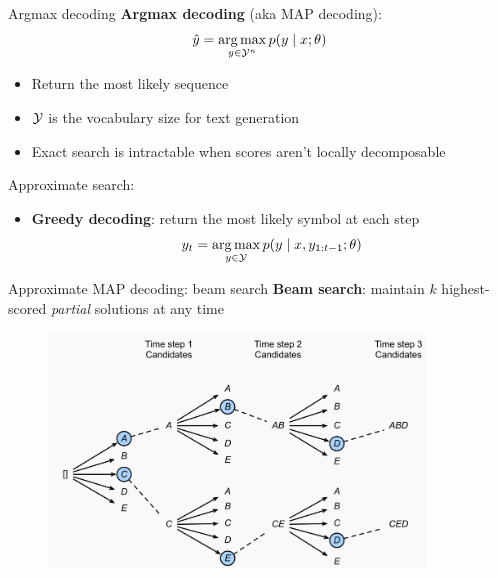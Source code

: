 \documentclass[usenames,dvipsnames,notes]{beamer}
\begin{document}
\begin{frame}
    {Argmax decoding}
    \textbf{Argmax decoding} (aka MAP decoding): 
    $$
    \hat{y} = \operatorname*{arg\,max}_{y\in\mathcal{Y}^n} p(y\mid x; \theta)
    $$
    \vspace{-1em}
    \begin{itemize}
        \item Return the most likely sequence
        \item $\mathcal{Y}$ is the vocabulary size for text generation
        \item Exact search is intractable when scores aren't locally decomposable
    \end{itemize}

    Approximate search:\\
    \begin{itemize}
        \item \textbf{Greedy decoding}: return the most likely symbol at each step
            $$
            y_t = \operatorname*{arg\,max}_{y\in\mathcal{Y}} p(y\mid x, y_{1:t-1}; \theta)
            $$
    \end{itemize}
\end{frame}

\begin{frame}
    {Approximate MAP decoding: beam search}
    \textbf{Beam search}: maintain $k$ highest-scored \textit{partial} solutions at any time
    \vspace{-1em}
    \begin{figure}
        \includegraphics[width=10cm]{figures/beam-search}
    \end{figure}
\end{frame}
\end{document}
